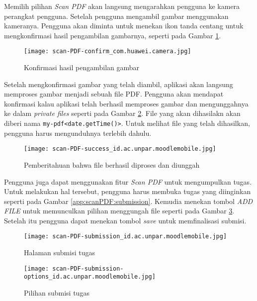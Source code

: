 Memilih pilihan \textit{Scan PDF} akan langsung mengarahkan pengguna ke kamera perangkat pengguna. Setelah pengguna mengambil gambar menggunakan kameranya. Pengguna akan diminta untuk menekan ikon tanda centang untuk mengkonfirmasi hasil pengambilan gambarnya, seperti pada Gambar \ref{app:scanPDF:confirm}.

\begin{figure}[H] 
	\centering  
	\texttt{[image: scan-PDF-confirm\_com.huawei.camera.jpg]}  
	\caption[Konfirmasi hasil pengambilan gambar] {Konfirmasi hasil pengambilan gambar} 
	\label{app:scanPDF:confirm} 
\end{figure}  

Setelah mengkonfirmasi gambar yang telah diambil, aplikasi akan langsung memproses gambar menjadi sebuah file PDF. Pengguna akan mendapat konfirmasi kalau aplikasi telah berhasil memproses gambar dan mengunggahnya ke dalam \textit{private files} seperti pada Gambar \ref{app:scanPDF:success}. File yang akan dihasilakn akan diberi nama \texttt{my-pdf<date.getTime()>}. Untuk melihat file yang telah dihasilkan, pengguna harus mengunduhnya terlebih dahulu.

\begin{figure}[H] 
	\centering  
	\texttt{[image: scan-PDF-success\_id.ac.unpar.moodlemobile.jpg]}  
	\caption[Pemberitahuan bahwa file berhasil diproses dan diunggah] {Pemberitahuan bahwa file berhasil diproses dan diunggah} 
	\label{app:scanPDF:success} 
\end{figure}  

Pengguna juga dapat menggunakan fitur \textit{Scan PDF} untuk mengumpulkan tugas. Untuk melakukan hal tersebut, pengguna harus membuka tugas yang diinginkan seperti pada Gambar \ref{app:scanPDF:submission}. Kemudia menekan tombol \textit{ADD FILE} untuk memunculkan pilihan menggungah file seperti pada Gambar \ref{app:scanPDF:submission:options}. Setelah itu pengguna dapat menekan tombol \textit{save} untuk memfinalisasi submisi.

\begin{figure}[H]
	\centering
	\begin{minipage}{.3\textwidth}
	\centering  
	\texttt{[image: scan-PDF-submission\_id.ac.unpar.moodlemobile.jpg]}  
	\caption[Halaman submisi tugas] {Halaman submisi tugas} 
	\label{app:scanPDF:submission} 
	\end{minipage}
	\hspace{.3\textwidth}
	\begin{minipage}{.3\textwidth}
	\centering  
	\texttt{[image: scan-PDF-submission-options\_id.ac.unpar.moodlemobile.jpg]}  
	\caption[Pilihan submisi tugas] {Pilihan submisi tugas} 
	\label{app:scanPDF:submission:options} 
	\end{minipage}
\end{figure}

